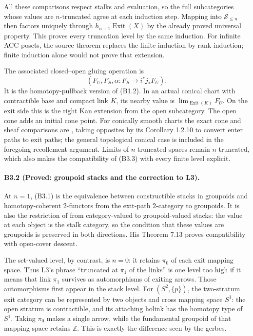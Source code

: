 All these comparisons respect stalks and evaluation, so the full
subcategories whose values are $n$-truncated agree at each induction
step. Mapping into $\mathcal S_{\leq n}$ then factors uniquely through
$h_{n+1}\operatorname{Exit}(X)$ by the already proved universal
property. This proves every truncation level by the same induction.
For infinite ACC posets, the source theorem replaces the finite
induction by rank induction; finite induction alone would not prove
that extension.

The associated closed--open gluing operation is
\[
 (F_U,F_S,\alpha:F_S\longrightarrow i^*j_*F_U).
 \tag{B3.3}
\]
It is the homotopy-pullback version of (B1.2). In an actual conical
chart with contractible base and compact link $K$, its nearby value
is $\lim_{\operatorname{Exit}(K)}F_U$. On the exit side this is the
right Kan extension from the open subcategory. The open cone adds
an initial cone point. For conically smooth charts the exact cone
and sheaf comparisons are \cite[Lemmas 6.1.4 and 6.1.7]{AFTLocal},
taking opposites by its Corollary 1.2.10 to convert enter paths to exit paths;
the general topological conical case is included in the foregoing
recollement argument. Limits of $n$-truncated spaces remain
$n$-truncated, which also makes the compatibility of (B3.3) with
every finite level explicit.

\paragraph{B3.2 (Proved: groupoid stacks and the correction to L3).}
At $n=1$, (B3.1) is the equivalence between constructible stacks in
groupoids and homotopy-coherent $2$-functors from the exit-path
$2$-category to groupoids. It is also the restriction of
\cite[Theorem 7.14]{Treumann2009} from category-valued to
groupoid-valued stacks: the value at each object is the stalk
category, so the condition that these values are groupoids is
preserved in both directions. His Theorem 7.13 proves compatibility
with open-cover descent.

The set-valued level, by contrast, is $n=0$: it retains $\pi_0$ of
each exit mapping space. Thus L3's phrase ``truncated at $\pi_1$ of
the links'' is one level too high if it means that link $\pi_1$
survives as automorphisms of exiting arrows. Those automorphisms
first appear in the stack level. For $(S^2,\{p\})$, the two-stratum
exit category can be represented by two objects and cross mapping
space $S^1$: the open stratum is contractible, and its attaching
holink has the homotopy type of $S^1$. Taking $\pi_0$ makes a single
arrow, while the fundamental groupoid of that mapping space retains
$\mathbb Z$. This is exactly the difference seen by the gerbes.

